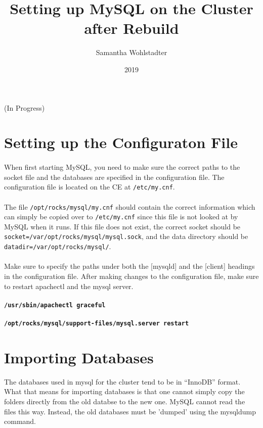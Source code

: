 \documentclass[12pt]{article}
\begin{document}
\title{Setting up MySQL on the Cluster after Rebuild}
\date{2019} %
\author{Samantha Wohlstadter}
\thispagestyle{empty}
\maketitle

(In Progress)

\section{Setting up the Configuraton File}

\paragraph{} When first starting MySQL, you need to make sure the correct paths to the socket file and the databases are specified in the configuration file. The configuration file  is located on the CE at {\tt /etc/my.cnf}.
\paragraph{}
The file {\tt /opt/rocks/mysql/my.cnf} should contain the correct information which can simply be copied over to {\tt /etc/my.cnf} since this file is not looked at by MySQL when it runs. If this file does not exist, the correct socket should be {\tt socket=/var/opt/rocks/mysql/mysql.sock}, and the data directory should be {\tt datadir=/var/opt/rocks/mysql/}.

\paragraph{} Make sure to specify the paths under both the [mysqld] and the [client] headings in the configuration file.
 After making changes to the configuration file, make sure to restart apachectl and the mysql server.
 \paragraph
     {\tt /usr/sbin/apachectl graceful}
\paragraph
    {\tt /opt/rocks/mysql/support-files/mysql.server restart }

\section{Importing Databases}
The databases used in mysql for the cluster tend to be in ``InnoDB'' format. What that means for importing databases is that one cannot simply copy the folders directly from the old databse to the new one. MySQL cannot read the files this way. Instead, the old databases must be 'dumped' using the mysqldump command.
\end{document}
